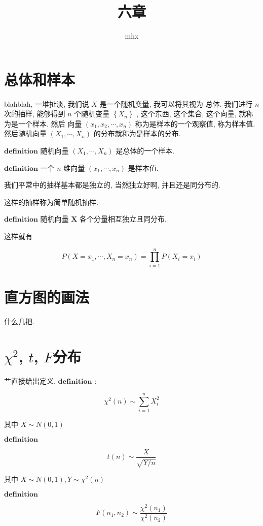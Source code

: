 \documentclass[a4paper, 10pt]{ctexart} %
\title{六章}
\author{mhx}
\begin{document}
\section{总体和样本}
blahblah, 一堆扯淡, 我们说 $X$ 是一个随机变量, 我可以将其视为 总体. 
我们进行 $n$ 次的抽样, 能够得到 $n$ 个随机变量 $\left\{X_n\right\}$ , 这个东西, 这个集合, 这个向量, 就称为是一个样本. 然后
向量 $\left(x_1,x_2,\cdots , x_n\right)$ 称为是样本的一个观察值, 称为样本值. 然后随机向量 $\left(X_1, \cdots , X_n\right)$ 的分布就称为是样本的分布. 

$\mathbf{definition}$ 随机向量 $\left(X_1, \cdots ,X_n\right)$ 是总体的一个样本. 

$\mathbf{definition}$ 一个 $n$ 维向量 $\left(x_1, \cdots ,x_n\right)$ 是样本值. 

我们平常中的抽样基本都是独立的, 当然独立好啊, 并且还是同分布的. 

这样的抽样称为简单随机抽样. 

$\mathbf{definition}$  随机向量 $\mathbf{X}$ 各个分量相互独立且同分布.

这样就有 



$$P(X=x_1, \cdots ,X_n = x_n) = \prod _{i=1}^{n} P\left(X_{i} = x_{i}\right)$$

\section{直方图的画法}
什么几把.
\section{$\chi^{2}$, $t$, $F$分布}
艹直接给出定义. 
$\mathbf{definition}$ : 

$$\chi^{2}\left(n\right) \sim \sum_{i=1}^{n}X^{2}_{i}$$

其中 $X \sim N \left(0, 1\right)$

$\mathbf{definition}$

$$t\left(n\right) \sim \frac{X}{\sqrt{Y / n}}$$

其中 $X\sim N\left(0,1\right) , Y \sim \chi ^{2} \left(n\right)$

$\mathbf{definition}$

$$F\left(n_1, n_2\right) \sim \frac{\chi^{2}\left(n_1 \right)}{\chi ^{2}\left(n_2\right)}$$
\end{document}
